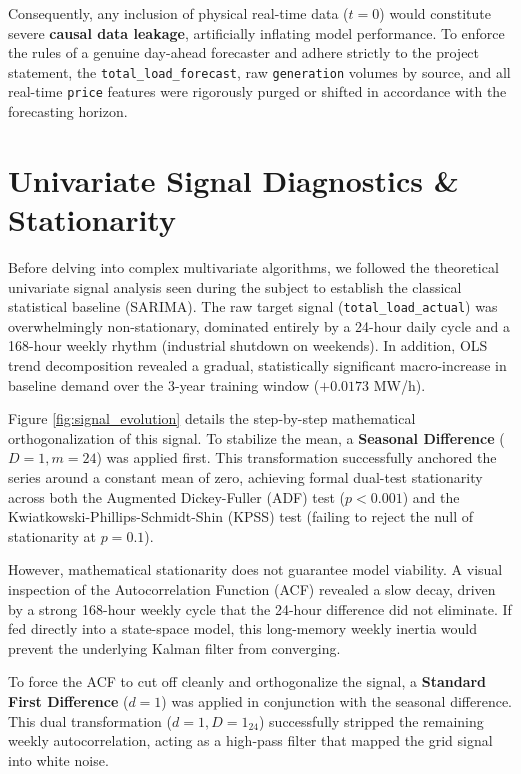 \documentclass{article}
\begin{document}
Consequently, any inclusion of physical real-time data ($t=0$) would constitute severe \textbf{causal data leakage}, artificially inflating model performance. To enforce the rules of a genuine day-ahead forecaster and adhere strictly to the project statement, the \texttt{total\_load\_forecast}, raw \texttt{generation} volumes by source, and all real-time \texttt{price} features were rigorously purged or shifted in accordance with the forecasting horizon.

\section{Univariate Signal Diagnostics \& Stationarity}

Before delving into complex multivariate algorithms, we followed the theoretical univariate signal analysis seen during the subject to establish the classical statistical baseline (SARIMA). The raw target signal (\texttt{total\_load\_actual}) was overwhelmingly non-stationary, dominated entirely by a 24-hour daily cycle and a 168-hour weekly rhythm (industrial shutdown on weekends). In addition, OLS trend decomposition revealed a gradual, statistically significant macro-increase in baseline demand over the 3-year training window ($+0.0173$ MW/h).

Figure \ref{fig:signal_evolution} details the step-by-step mathematical orthogonalization of this signal. To stabilize the mean, a \textbf{Seasonal Difference} ($D=1, m=24$) was applied first. This transformation successfully anchored the series around a constant mean of zero, achieving formal dual-test stationarity across both the Augmented Dickey-Fuller (ADF) test ($p < 0.001$) and the Kwiatkowski-Phillips-Schmidt-Shin (KPSS) test (failing to reject the null of stationarity at $p = 0.1$). 

However, mathematical stationarity does not guarantee model viability. A visual inspection of the Autocorrelation Function (ACF) revealed a slow decay, driven by a strong 168-hour weekly cycle that the 24-hour difference did not eliminate. If fed directly into a state-space model, this long-memory weekly inertia would prevent the underlying Kalman filter from converging. 

To force the ACF to cut off cleanly and orthogonalize the signal, a \textbf{Standard First Difference} ($d=1$) was applied in conjunction with the seasonal difference. This dual transformation ($d=1, D=1_{24}$) successfully stripped the remaining weekly autocorrelation, acting as a high-pass filter that mapped the grid signal into white noise.
\end{document}
